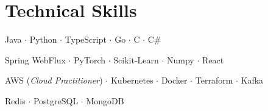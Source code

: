 \documentclass[letterpaper,11pt]{article}
\begin{document}
\section{Technical Skills}
 \begin{description}[leftmargin=!,labelwidth=\widthof{\textsc{Programming Languages}}, itemsep=0.5pt, parsep=0.5pt, font=\normalfont\small]
    \item[\textsc{Programming Languages:}] \small Java $\cdot$ Python $\cdot$ TypeScript $\cdot$ Go $\cdot$ C $\cdot$ C\#
    \item[\textsc{Frameworks/Libraries:}]  Spring WebFlux $\cdot$ PyTorch $\cdot$ Scikit-Learn $\cdot$ Numpy $\cdot$ React
    \item[\textsc{Cloud/DevOps:}] \small AWS (\textit{Cloud Practitioner}) $\cdot$ Kubernetes $\cdot$ Docker $\cdot$ Terraform $\cdot$ Kafka
    \item[\textsc{Databases:}] \small Redis $\cdot$ PostgreSQL $\cdot$ MongoDB
    
\end{description}
\vspace{-4pt}


\end{document}
